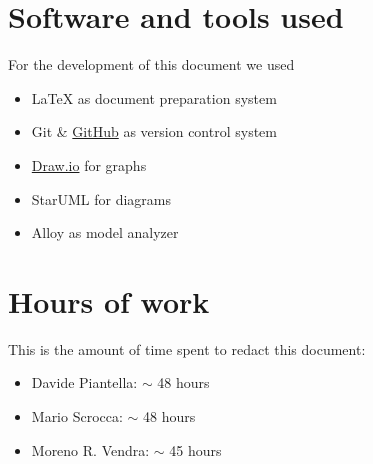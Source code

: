 \begin{appendices}
	\section{Software and tools used}
	For the development of this document we used
	\begin{itemize}
		\item \LaTeX{} as document preparation system
		\item Git \& \href{http://github.com}{GitHub} as version control system
		\item \href{http://draw.io}{Draw.io} for graphs
		\item StarUML for diagrams
		\item Alloy as model analyzer
	\end{itemize}
	
	\section{Hours of work}
	This is the amount of time spent to redact this document:
	\begin{itemize}
		\item Davide Piantella: $\sim$ 48 hours
		\item Mario Scrocca: $\sim$ 48 hours
		\item Moreno R. Vendra: $\sim$ 45 hours
	\end{itemize}
	

\end{appendices}

